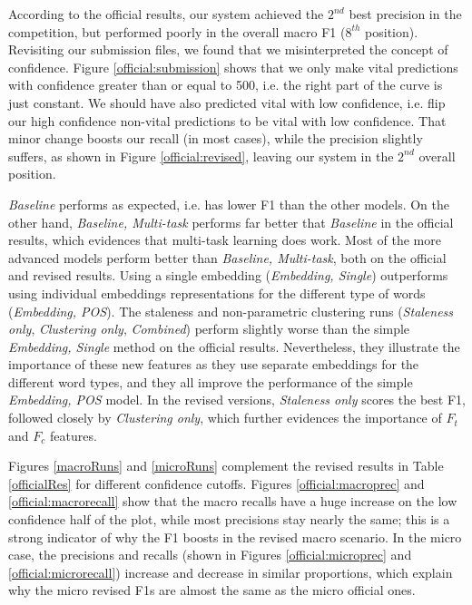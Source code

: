 \documentclass{article}
\begin{document}
According to the official results, our system achieved the $2^{nd}$ best precision in the competition, but performed poorly in the overall macro F1 ($8^{th}$ position). Revisiting our submission files, we found that we misinterpreted the concept of confidence. Figure \ref{official:submission} shows that we only make vital predictions with confidence greater than or equal to 500, i.e. the right part of the curve is just constant. We should have also predicted vital with low confidence, i.e. flip our high confidence non-vital predictions to be vital with low confidence. That minor change boosts our recall (in most cases), while the precision slightly suffers, as shown in Figure \ref{official:revised}, leaving our system in the $2^{nd}$ overall position.

{\textit{Baseline}} performs as expected, i.e. has lower F1 than the other models.
On the other hand, {\textit{Baseline, Multi-task}} performs far better that {\textit{Baseline}} in the official results, which evidences that multi-task learning does work.
Most of the more advanced models perform better than {\textit{Baseline, Multi-task}}, both on the official and revised results. Using a single embedding ({\textit{Embedding, Single}}) outperforms using individual embeddings representations for the different type of words ({\textit{Embedding, POS}}).
The staleness and non-parametric clustering runs ({\textit{Staleness only}}, {\textit{Clustering only}}, {\textit{Combined}}) perform slightly worse than the simple {\textit{Embedding, Single}} method on the official results. Nevertheless, they illustrate the importance of these new features as they use separate embeddings for the different word types, and they all improve the performance of the simple {\textit{Embedding, POS}} model. In the revised versions, {\textit{Staleness only}} scores the best F1, followed closely by {\textit{Clustering only}}, which further evidences the importance of $F_t$ and $F_c$ features.

Figures \ref{macroRuns} and \ref{microRuns} complement the revised results in Table \ref{officialRes} for different confidence cutoffs. Figures \ref{official:macroprec} and \ref{official:macrorecall} show that the macro recalls have a huge increase on the low confidence half of the plot, while most precisions stay nearly the same; this is a strong indicator of why the F1 boosts in the revised macro scenario.
In the micro case, the precisions and recalls (shown in Figures \ref{official:microprec} and \ref{official:microrecall}) increase and decrease in similar proportions, which explain why the micro revised F1s are almost the same as the micro official ones. 
\end{document}
